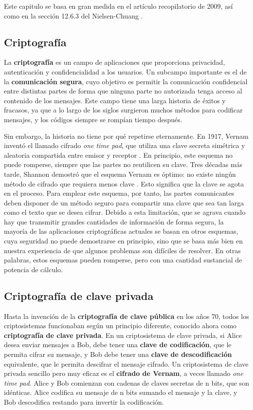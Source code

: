 \documentclass[a4paper,11pt]{book} %
\numberwithin{equation}{chapter}
\begin{document}
Este capitulo se basa en gran medida en el artículo recopilatorio \cite{bib_QKD_resumen} de 2009, así como en la sección 12.6.3 del Nielsen-Chuang \cite{bib_nielsen_chuang_2010}.

	\subsection{Criptografía}
	
	La \textbf{criptografía} es un campo de aplicaciones que proporciona privacidad, autenticación y confidencialidad a los usuarios. Un subcampo importante es el de la \textbf{comunicación segura}, cuyo objetivo es permitir la comunicación confidencial entre distintas partes de forma que ninguna parte no autorizada tenga acceso al contenido de los mensajes. Este campo tiene una larga historia de éxitos y fracasos, ya que a lo largo de los siglos surgieron muchos métodos para codificar mensajes, y los códigos siempre se rompían tiempo después.

Sin embargo, la historia no tiene por qué repetirse eternamente. En 1917, Vernam inventó el llamado cifrado \textit{one time pad}, que utiliza una clave secreta simétrica y aleatoria compartida entre emisor y receptor \cite{bib_Vernam-1926}. En principio, este esquema no puede romperse, siempre que las partes no reutilicen su clave. Tres décadas más tarde, Shannon demostró que el esquema Vernam es óptimo: no existe ningún método de cifrado que requiera menos clave \cite{bib_Shannon-1949}. Esto significa que la clave se agota en el proceso. Para emplear este esquema, por tanto, las partes comunicantes deben disponer de un método seguro para compartir una clave que sea tan larga como el texto que se desea cifrar. Debido a esta limitación, que se agrava cuando hay que transmitir grandes cantidades de información de forma segura, la mayoría de las aplicaciones criptográficas actuales se basan en otros esquemas, cuya seguridad no puede demostrarse en principio, sino que se basa más bien en nuestra experiencia de que algunos problemas son difíciles de resolver. En otras palabras, estos esquemas pueden romperse, pero con una cantidad sustancial de potencia de cálculo. 

		\subsection{Criptografía de clave privada}
	
Hasta la invención de la \textbf{criptografía de clave pública} en los años 70, todos los criptosistemas funcionaban según un principio diferente, conocido ahora como \textbf{criptografía de clave privada}. En un criptosistema de clave privada, si Alice desea enviar mensajes a Bob, debe tener una \textbf{clave de codificación}, que le permita cifrar su mensaje, y Bob debe tener una \textbf{clave de descodificación} equivalente, que le permita descifrar el mensaje cifrado. Un criptosistema de clave privada sencillo pero muy eficaz es el \textbf{cifrado de Vernam}, a veces llamado \textit{one time pad}. Alice y Bob comienzan con cadenas de claves secretas de n bits, que son idénticas. Alice codifica su mensaje de n bits sumando el mensaje y la clave, y Bob descodifica restando para invertir la codificación.
\end{document}
